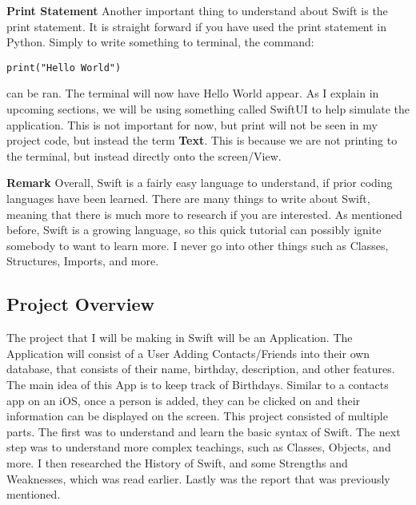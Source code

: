 \documentclass{article}
\theoremstyle{theorem}
\theoremstyle{definition}
\theoremstyle{remark}
\begin{document}
\noindent\newline\newline \textbf{Print Statement}
\noindent\newline Another important thing to understand about Swift is the print statement. It is straight forward if you have used the print statement in Python. Simply to write something to terminal, the command:
\begin{verbatim}
print("Hello World")
\end{verbatim}
\noindent can be ran. The terminal will now have Hello World appear. As I explain in upcoming sections, we will be using something called SwiftUI to help simulate the application. This is not important for now, but print will not be seen in my project code, but instead the term \textbf{Text}. This is because we are not printing to the terminal, but instead directly onto the screen/View.

\noindent\newline\newline \textbf{Remark}
\noindent\newline Overall, Swift is a fairly easy language to understand, if prior coding languages have been learned. There are many things to write about Swift, meaning that there is much more to research if you are interested. As mentioned before, Swift is a growing language, so this quick tutorial can possibly ignite somebody to want to learn more. I never go into other things such as Classes, Structures, Imports, and more. 



\subsection{Project Overview}
The project that I will be making in Swift will be an Application. The Application will consist of a User Adding Contacts/Friends into their own database, that consists of their name, birthday, description, and other features. The main idea of this App is to keep track of Birthdays. Similar to a contacts app on an iOS, once a person is added, they can be clicked on and their information can be displayed on the screen. This project consisted of multiple parts. The first was to understand and learn the basic syntax of Swift. The next step was to understand more complex teachings, such as Classes, Objects, and more. I then researched the History of Swift, and some Strengths and Weaknesses, which was read earlier. Lastly was the report that was previously mentioned.
\end{document}

